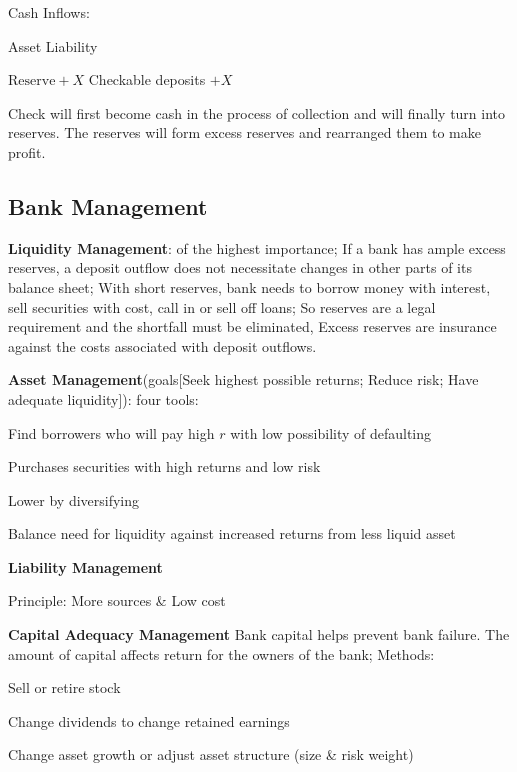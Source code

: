 \documentclass[10pt, a4paper]{article}
\begin{document}
    Cash Inflows: 
    \begin{center}
            Asset \quad \quad \quad \quad Liability

            $\text{Reserve} + X$ \quad  Checkable deposits $+ X$
    \end{center} 

        Check will first become cash in the process of collection and will finally turn into reserves. The reserves will form excess reserves and rearranged them to make profit. 

    \subsection{Bank Management}
        \textbf{Liquidity Management}: of the highest importance; If a bank has ample excess reserves, a deposit outflow does not necessitate changes in other parts of its balance sheet; With short reserves, bank needs to borrow money with interest, sell securities with cost, call in or sell off loans; So reserves are a legal requirement and the shortfall must be eliminated,  Excess reserves are insurance against the costs associated with deposit outflows. 
        \medskip

     \textbf{Asset Management}(goals[Seek highest possible returns; Reduce risk; Have adequate liquidity]): four tools:
            
        \quad Find borrowers who will pay high $r$ with low possibility of defaulting 

        \quad Purchases securities with high returns and low risk 

        \quad Lower by diversifying 

        \quad Balance need for liquidity against increased returns from less liquid asset 
        \medskip

        \textbf{Liability Management}

            \quad Principle: More sources \& Low cost
        
        \medskip 

        \textbf{Capital Adequacy Management} 
            Bank capital helps prevent bank failure. The amount of capital affects return for the owners of the bank; Methods: 

            \quad Sell or retire stock 

            \quad Change dividends to change retained earnings 

            \quad Change asset growth or adjust asset structure (size \& risk weight)
        
\end{document}
